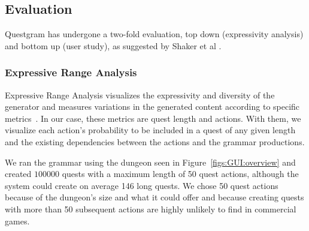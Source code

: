 \subsection{Evaluation}

Questgram has undergone a two-fold evaluation, %
top down (expressivity analysis) and bottom up (user study), as suggested by Shaker et al \cite{p8shaker_procedural_2016}. %



\subsubsection{Expressive Range Analysis} \label{sec:quantExp}

Expressive Range Analysis visualizes the expressivity and diversity of the generator and measures variations in the generated content according to specific metrics~\cite{p8Smith:2010:Expressive-range}. In our case, these metrics are quest length and actions. With them, we visualize each action's probability to be included in a quest of any given length and the existing dependencies between the actions and the grammar productions. 

We ran the grammar using the dungeon seen in Figure~\ref{figs:GUI:overview} and created $100000$ quests with a maximum length of 50 quest actions, although the system could create on average 146 long quests. We chose 50 quest actions because of the dungeon's size and what it could offer and because creating quests with more than 50 subsequent %
actions are highly unlikely to find in commercial games. 

